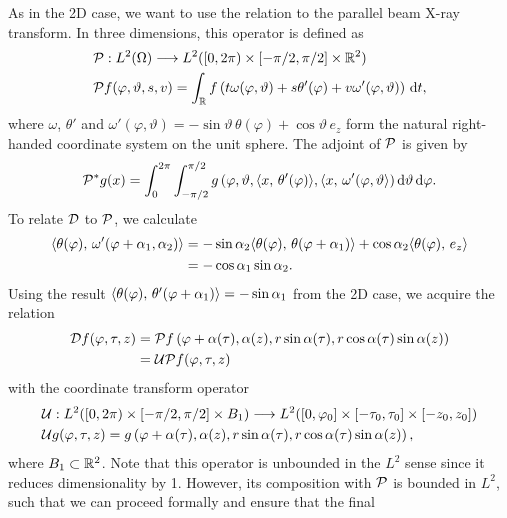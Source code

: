 \documentclass{amsart}
\renewcommand*{\phi}{\varphi}
\begin{document}
%
As in the 2D case, we want to use the relation to the parallel beam X-ray transform. In three dimensions, this operator is defined as
%
\begin{align}
 & \OPP: L^2(\Omega) \Lto L^2([0,2\pi) \times [-\pi/2, \pi/2] \times \RR^2) \notag \\
 \label{eq:coneflat:xray_fwdproj}
 & \OPP f(\phi, \vartheta, s, v) = \int_\RR f\left( t\omega(\phi, \vartheta) + s \theta'(\phi) + v \omega'(\phi,\vartheta) 
 \right)\, \D t, 
\end{align}
%
where $\omega$, $\theta'$ and $\omega'(\phi, \vartheta) = -\sin\vartheta\, \theta(\phi) + \cos\vartheta\, e_z$ form the natural 
right-handed coordinate system on the unit sphere. The adjoint of ${\mathcal{P}}$ is given by
%
\begin{equation}
 \label{eq:coneflat:xray_backproj}
 \OPP^* g(x) = \int_0^{2\pi} \int_{-\pi/2}^{\pi/2} g\left( \phi, \vartheta, \INNER{x}{\theta'(\phi)}, \INNER{x}{\omega'(\phi, \vartheta} 
 \right) \D\vartheta\, \D\phi.
\end{equation}
%
To relate ${\mathcal{D}}$ to ${\mathcal{P}}$, we calculate
%
\begin{align*}
 \INNER{\theta(\phi)}{\omega'(\phi + \alpha_1, \alpha_2)} 
 &= -\sin\alpha_2 \INNER{\theta(\phi)}{\theta(\phi + \alpha_1)} + \cos\alpha_2 \INNER{\theta(\phi)}{e_z} \\
 &= -\cos\alpha_1 \sin\alpha_2.
\end{align*}
%
Using the result $\INNER{\theta(\phi)}{\theta'(\phi+\alpha_1)} = -\sin\alpha_1$ from the 2D case, we acquire the relation
%
\begin{align*}
 \OPD f(\phi, \tau, z) 
 &= \OPP f\left( \phi + \alpha(\tau), \alpha(z), r\sin\alpha(\tau), r\cos\alpha(\tau) \sin\alpha(z) \right) \\
 &= \OPU \OPP f(\phi, \tau, z)
\end{align*}
%
with the coordinate transform operator
%
\begin{align}
 & \OPU: L^2([0,2\pi) \times [-\pi/2, \pi/2] \times B_1) \Lto L^2([0,\phi_0] \times [-\tau_0, \tau_0] \times [-z_0, z_0]) \notag \\
 & \OPU g(\phi, \tau, z) = g\left( \phi + \alpha(\tau), \alpha(z), r\sin\alpha(\tau), r\cos\alpha(\tau) \sin\alpha(z) \right),
\end{align}
%
where $B_1 \subset {\ensuremath{\mathbb{R}}}^2$. Note that this operator is unbounded in the $L^2$ sense since it reduces 
dimensionality by 1. However, its composition with ${\mathcal{P}}$ is bounded in $L^2$, such that we can proceed formally and ensure that the final 
\end{document}
